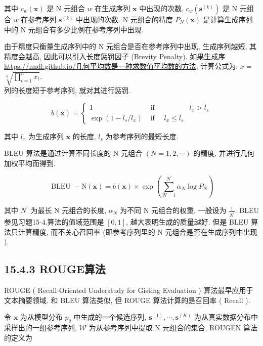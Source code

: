 \documentclass[10pt]{article}
\begin{document}
其中 $c_{w}(\boldsymbol{x})$ 是 $\mathrm{N}$ 元组合 $w$ 在生成序列 $\boldsymbol{x}$ 中出现的次数, $c_{w}\left(\boldsymbol{s}^{(k)}\right)$ 是 $\mathrm{N}$ 元组合 $w$ 在参考序列 $\boldsymbol{s}^{(k)}$ 中出现的次数. $\mathrm{N}$ 元组合的精度 $P_{N}(\boldsymbol{x})$ 是计算生成序列中的 $\mathrm{N}$ 元组合有多少比例在参考序列中出现.

由于精度只衡量生成序列中的 $\mathrm{N}$ 元组合是否在参考序列中出现, 生成序列越短, 其精度会越高, 因此可以引入长度惩罚因子 (Brevity Penalty). 如果生成序 \href{https://nndl.github.io/%E5%87%A0%E4%BD%95%E5%B9%B3%E5%9D%87%E6%95%B0%E6%98%AF%E4%B8%80%E7%A7%8D%E6%B1%82%E6%95%B0%E5%80%BC%E5%B9%B3%E5%9D%87%E6%95%B0%E7%9A%84%E6%96%B9%E6%B3%95}{https://nndl.github.io/几何平均数是一种求数值平均数的方法}, 计算公式为: $\bar{x}=$ $\sqrt[n]{\prod_{t=1}^{n} x_{t}}$.\\
列的长度短于参考序列, 就对其进行惩罚.

\[
b(\boldsymbol{x})=\left\{\begin{array}{ccc}
1 & \text { if } & l_{x}>l_{s}  \tag{15.40}\\
\exp \left(1-l_{s} / l_{x}\right) & \text { if } \quad l_{x} \leq l_{s}
\end{array}\right.
\]

其中 $l_{x}$ 为生成序列 $\boldsymbol{x}$ 的长度, $l_{s}$ 为参考序列的最短长度.

BLEU 算法是通过计算不同长度的 $\mathrm{N}$ 元组合 $(N=1,2, \cdots)$ 的精度, 并进行几何加权平均而得到.


\begin{equation*}
\operatorname{BLEU}-\mathrm{N}(\boldsymbol{x})=b(\boldsymbol{x}) \times \exp \left(\sum_{N=1}^{N^{\prime}} \alpha_{N} \log P_{N}\right) \tag{15.41}
\end{equation*}


其中 $N^{\prime}$ 为最长 $\mathrm{N}$ 元组合的长度, $\alpha_{N}$ 为不同 $\mathrm{N}$ 元组合的权重, 一般设为 $\frac{1}{N^{\prime}}$. BLEU 参见习题15-4.算法的值域范围是 $[0,1]$, 越大表明生成的质量越好. 但是 BLEU 算法只计算精度, 而不关心召回率 (即参考序列里的 $\mathrm{N}$ 元组合是否在生成序列中出现 ).

\subsection*{15.4.3 ROUGE算法}
ROUGE ( Recall-Oriented Understudy for Gisting Evaluation ) 算法最早应用于文本摘要领域. 和 BLEU 算法类似, 但 ROUGE 算法计算的是召回率 ( Recall ).

令 $\boldsymbol{x}$ 为从模型分布 $p_{\theta}$ 中生成的一个候选序列, $\boldsymbol{s}^{(1)}, \cdots, \boldsymbol{s}^{(K)}$ 为从真实数据分布中采样出的一组参考序列, $\mathcal{W}$ 为从参考序列中提取 $\mathrm{N}$ 元组合的集合, ROUGE$\mathrm{N}$ 算法的定义为
\end{document}
